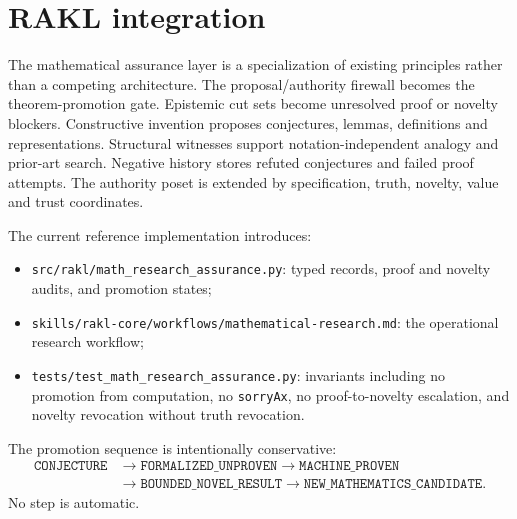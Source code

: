 \section{RAKL integration}

The mathematical assurance layer is a specialization of existing \RAKL{} principles rather than a competing architecture. The proposal/authority firewall becomes the theorem-promotion gate. Epistemic cut sets become unresolved proof or novelty blockers. Constructive invention proposes conjectures, lemmas, definitions and representations. Structural witnesses support notation-independent analogy and prior-art search. Negative history stores refuted conjectures and failed proof attempts. The authority poset is extended by specification, truth, novelty, value and trust coordinates.

The current reference implementation introduces:
\begin{itemize}[leftmargin=*]
\item \texttt{src/rakl/math\_research\_assurance.py}: typed records, proof and novelty audits, and promotion states;
\item \texttt{skills/rakl-core/workflows/mathematical-research.md}: the operational research workflow;
\item \texttt{tests/test\_math\_research\_assurance.py}: invariants including no promotion from computation, no \texttt{sorryAx}, no proof-to-novelty escalation, and novelty revocation without truth revocation.
\end{itemize}

The promotion sequence is intentionally conservative:
\[
\begin{aligned}
\texttt{CONJECTURE}
&\rightarrow \texttt{FORMALIZED\_UNPROVEN}
\rightarrow \texttt{MACHINE\_PROVEN}\\
&\rightarrow \texttt{BOUNDED\_NOVEL\_RESULT}
\rightarrow \texttt{NEW\_MATHEMATICS\_CANDIDATE}.
\end{aligned}
\]
No step is automatic.
